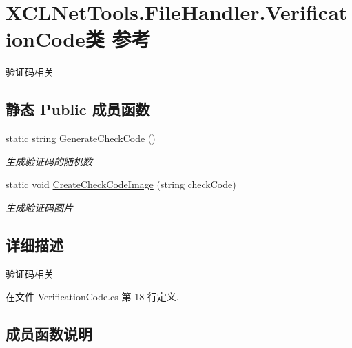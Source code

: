 \hypertarget{class_x_c_l_net_tools_1_1_file_handler_1_1_verification_code}{}\section{X\+C\+L\+Net\+Tools.\+File\+Handler.\+Verification\+Code类 参考}
\label{class_x_c_l_net_tools_1_1_file_handler_1_1_verification_code}


验证码相关  


\subsection*{静态 Public 成员函数}
\begin{DoxyCompactItemize}
\item 
static string \hyperlink{class_x_c_l_net_tools_1_1_file_handler_1_1_verification_code_af4beced22b07b395e6ae37452a895f32}{Generate\+Check\+Code} ()
\begin{DoxyCompactList}\small\item\em 生成验证码的随机数 \end{DoxyCompactList}\item 
static void \hyperlink{class_x_c_l_net_tools_1_1_file_handler_1_1_verification_code_acde0d83935e0d55da7a29725026a72e9}{Create\+Check\+Code\+Image} (string check\+Code)
\begin{DoxyCompactList}\small\item\em 生成验证码图片 \end{DoxyCompactList}\end{DoxyCompactItemize}


\subsection{详细描述}
验证码相关 



在文件 Verification\+Code.\+cs 第 18 行定义.



\subsection{成员函数说明}
